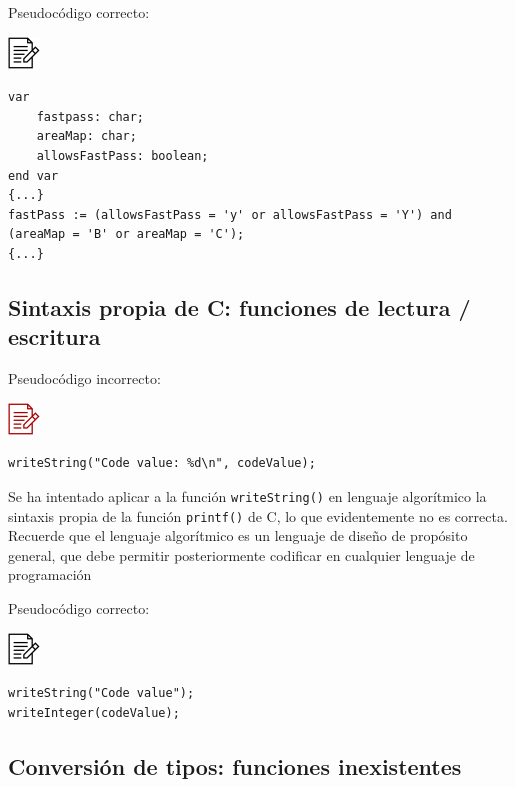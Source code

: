 \documentclass[
]{book}
\begin{document}
Pseudocódigo correcto:

\includegraphics{./img/alg.png}

\begin{verbatim}
var
    fastpass: char;
    areaMap: char;
    allowsFastPass: boolean;
end var
{...}
fastPass := (allowsFastPass = 'y' or allowsFastPass = 'Y') and (areaMap = 'B' or areaMap = 'C');
{...}
\end{verbatim}

\hypertarget{sintaxis-propia-de-c-funciones-de-lectura-escritura}{%
\subsection{Sintaxis propia de C: funciones de lectura / escritura}\label{sintaxis-propia-de-c-funciones-de-lectura-escritura}}

Pseudocódigo incorrecto:

\includegraphics{./img/alg_err.png}

\begin{verbatim}
writeString("Code value: %d\n", codeValue);
\end{verbatim}

Se ha intentado aplicar a la función \texttt{writeString()} en lenguaje algorítmico la sintaxis propia de la función \texttt{printf()} de C, lo que evidentemente no es correcta. Recuerde que el lenguaje algorítmico es un lenguaje de diseño de propósito general, que debe permitir posteriormente codificar en cualquier lenguaje de programación

Pseudocódigo correcto:

\includegraphics{./img/alg.png}

\begin{verbatim}
writeString("Code value");
writeInteger(codeValue);
\end{verbatim}

\hypertarget{conversiuxf3n-de-tipos-funciones-inexistentes}{%
\subsection{Conversión de tipos: funciones inexistentes}\label{conversiuxf3n-de-tipos-funciones-inexistentes}}
\end{document}
